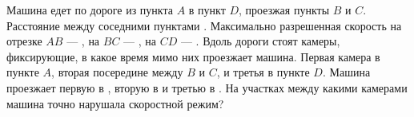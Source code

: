 Машина едет по дороге из пункта $A$ в пункт $D$, проезжая пункты $B$ и $C$. Расстояние между соседними пунктами . Максимально разрешенная скорость на отрезке $AB$ --- , на $BC$ --- , на $CD$ --- . Вдоль дороги стоят камеры, фиксирующие, в какое время мимо них проезжает машина. Первая камера в пункте $A$, вторая посередине между $B$ и $C$, и третья в пункте $D$. Машина проезжает первую в , вторую в   и третью в . На участках между какими камерами машина точно нарушала скоростной режим?